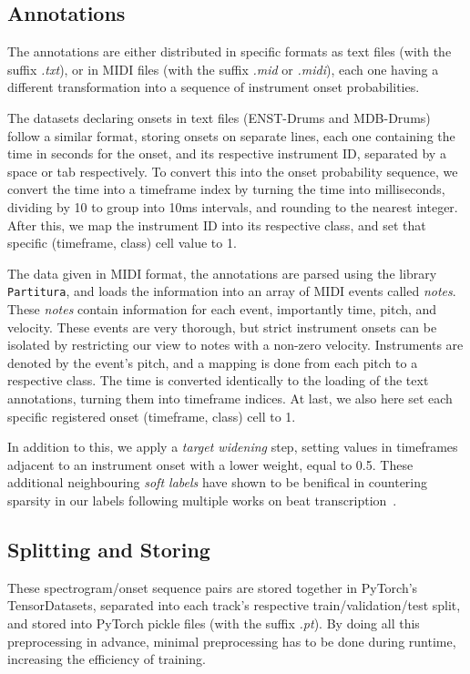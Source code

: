 \subsection{Annotations}

The annotations are either distributed in specific formats as text files (with the suffix \textit{.txt}), or in MIDI files (with the suffix \textit{.mid} or \textit{.midi}), each one having a different transformation into a sequence of instrument onset probabilities.

The datasets declaring onsets in text files (ENST-Drums and MDB-Drums) follow a similar format, storing onsets on separate lines, each one containing the time in seconds for the onset, and its respective instrument ID, separated by a space or tab respectively. To convert this into the onset probability sequence, we convert the time into a timeframe index by turning the time into milliseconds, dividing by 10 to group into 10ms intervals, and rounding to the nearest integer. After this, we map the instrument ID into its respective class, and set that specific (timeframe, class) cell value to 1.

The data given in MIDI format, the annotations are parsed using the library \texttt{Partitura}, and loads the information into an array of MIDI events called \textit{notes}. These \textit{notes} contain information for each event, importantly time, pitch, and velocity. These events are very thorough, but strict instrument onsets can be isolated by restricting our view to notes with a non-zero velocity. Instruments are denoted by the event's pitch, and a mapping is done from each pitch to a respective class. The time is converted identically to the loading of the text annotations, turning them into timeframe indices. At last, we also here set each specific registered onset (timeframe, class) cell to 1.

In addition to this, we apply a \textit{target widening} step, setting values in timeframes adjacent to an instrument onset with a lower weight, equal to 0.5. These additional neighbouring \textit{soft labels} have shown to be benifical in countering sparsity in our labels following multiple works on beat transcription~\cite{9747048, signals4040042}.

\subsection{Splitting and Storing}

These spectrogram/onset sequence pairs are stored together in PyTorch's TensorDatasets, separated into each track's respective train/validation/test split, and stored into PyTorch pickle files (with the suffix \textit{.pt}). By doing all this preprocessing in advance, minimal preprocessing has to be done during runtime, increasing the efficiency of training.

